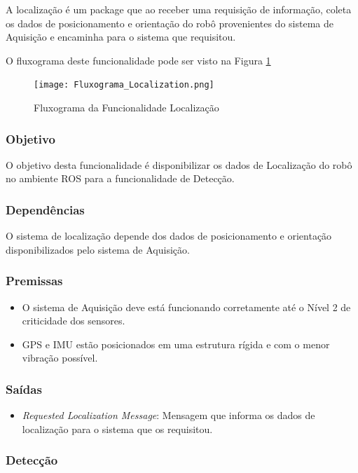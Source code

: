 A localização é um package que ao receber uma requisição de informação, coleta os dados de posicionamento e orientação do robô provenientes do sistema de Aquisição e encaminha para o sistema que requisitou.

O fluxograma deste funcionalidade pode ser visto na Figura \ref{fluxlocal}

\begin{figure}[h!]
	\centering
	\texttt{[image: Fluxograma\_Localization.png]}
	\caption{Fluxograma da Funcionalidade Localização} \label{fluxlocal}
\end{figure}


\subsubsection{Objetivo}
O objetivo desta funcionalidade é disponibilizar os dados de Localização do robô no ambiente ROS para a funcionalidade de Detecção.

\subsubsection{Dependências}
O sistema de localização depende dos dados de posicionamento e orientação disponibilizados pelo sistema de Aquisição.

\subsubsection{Premissas}
\begin{itemize}
	\item O sistema de Aquisição deve está funcionando corretamente até o Nível 2 de criticidade dos sensores.
	\item GPS e IMU estão posicionados em uma estrutura rígida e com o menor vibração possível.
\end{itemize}

\subsubsection{Saídas}

\begin{itemize}
	\item \textit{Requested Localization Message}: Mensagem que informa os dados de localização para o sistema que os requisitou.
\end{itemize}

\subsubsection{Detecção}
\label{ssec:func3}

